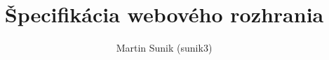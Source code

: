 \documentclass[12pt]{article}
\begin{document}
\title{Špecifikácia webového rozhrania}
\author{Martin Sunik (sunik3)}
\maketitle
\end{document}
